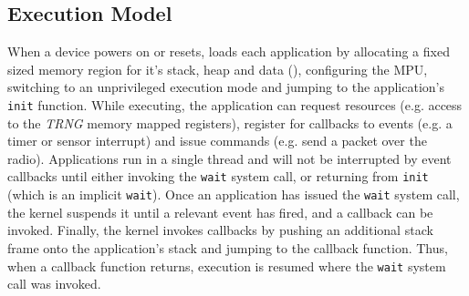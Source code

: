 
\subsection{Execution Model}

When a device powers on or resets, \name loads each application by allocating a
fixed sized memory region for it's stack, heap and data
(), configuring the MPU, switching to an
unprivileged execution mode and jumping to the application's {\tt init}
function. While executing, the application can request resources (e.g. access to
the \emph{TRNG} memory mapped registers), register for callbacks to events (e.g. a
timer or sensor interrupt) and issue commands (e.g. send a packet over the
radio). Applications run in a single thread and will not be interrupted by event
callbacks until either invoking the {\tt wait} system call, or returning from
{\tt init} (which is an implicit {\tt wait}). Once an application has issued the
{\tt wait} system call, the kernel suspends it until a relevant event has fired,
and a callback can be invoked. Finally, the kernel invokes callbacks by pushing
an additional stack frame onto the application's stack and jumping to the
callback function. Thus, when a callback function returns, execution is resumed
where the {\tt wait} system call was invoked.


%

